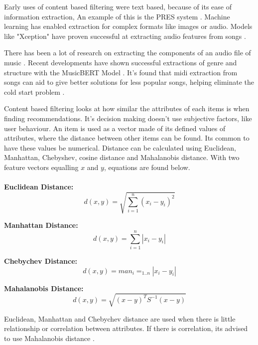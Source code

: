 Early uses of content based filtering were text based, because of its ease of information extraction, An example of this is the PRES system \citep{van_meteren_using_2000}. Machine learning has enabled extraction for complex formats like images or audio. Models like "Xception" have proven successful at extracting audio features from songs \citep{chollet_xception_2017} \citep{singh_robustness_2022}.

There has been a lot of research on extracting the components of an audio file of music \citep{ribecky_multi-input_2021} \citep{zhao_musical_2022}. Recent developments have shown successful extractions of genre and structure with the MusicBERT Model \citep{zhu_musicbert_2021}. It's found that midi extraction from songs can aid to give better solutions for less popular songs, helping eliminate the cold start problem \citep{yadav_improved_2022}.

Content based filtering looks at how similar the attributes of each items is when finding recommendations. It's decision making doesn't use subjective factors, like user behaviour. An item is used as a vector made of its defined values of attributes, where the distance between other items can be found. Its common to have these values be numerical. Distance can be calculated using Euclidean, Manhattan, Chebyshev, cosine distance and Mahalanobis distance. With two feature vectors equalling $x$ and $y$, equations are found below.
\\
\\
\textbf{Euclidean Distance:}
\begin{equation}
	d(x,y) = \sqrt{\sum _{i=1} ^{n}(x_{i} - y_{i})^{2}}
\end{equation}

\textbf{Manhattan Distance:}
\begin{equation}
	d(x,y) = \sum _{i=1} ^{n} | x_{i} - y_{i} |
\end{equation}

\textbf{Chebychev Distance:}
\begin{equation}
	d(x,y) = man_{i} = _{1 . . n} | x_{i} - y_{i} |
\end{equation}

\textbf{Mahalanobis Distance:}
\begin{equation}
	d(x,y) = \sqrt{ ( x - y )^{ T } S^{ -1 } ( x - y ) }
\end{equation}

Euclidean, Manhattan and Chebychev distance are used when there is little relationship or correlation between attributes. If there is correlation, its advised to use Mahalanobis distance \citep{celma_recommendation_2010}.

